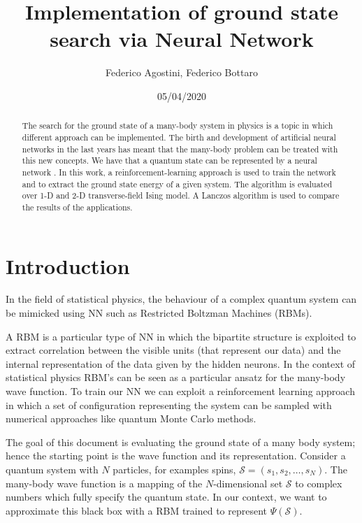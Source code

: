 \documentclass[a4paper,11pt]{article}
\begin{document}
\title{Implementation of ground state search via Neural Network}
\author{Federico Agostini, Federico Bottaro}
\date{05/04/2020}
\maketitle


\begin{abstract}

The search for the ground state of a many-body system in physics is a topic in which different approach can be implemented. The birth and development of artificial neural networks in the last years has meant that the many-body problem can be treated with this new concepts. We have that a quantum state can be represented by a neural network \cite{Carleo_2017}. In this work, a reinforcement-learning approach is used to train the network and to extract the ground state energy of a given system. The algorithm is evaluated over 1-D and 2-D transverse-field Ising model. A Lanczos algorithm is used to compare the results of the applications.

\end{abstract}


\section{Introduction}

In the field of statistical physics, the behaviour of a complex quantum system can be mimicked using NN such as Restricted Boltzman Machines (RBMs). 

A RBM is a particular type of NN in which the bipartite structure is exploited to extract correlation between the visible units (that represent our data) and the internal representation of the data given by the hidden neurons. In the context of statistical physics RBM's can be seen as a particular ansatz for the many-body wave function. To train our NN we can exploit a reinforcement learning approach in which a set of configuration representing the system can be sampled with numerical approaches like quantum Monte Carlo methods.

The goal of this document is evaluating the ground state of a many body system; hence the starting point is the wave function and its representation. Consider a quantum system with $N$ particles, for examples spins, $\mathcal{S}=(s_1,s_2,\dots,s_N)$. The many-body wave function is a mapping of the $N$-dimensional set $\mathcal{S}$ to complex numbers which fully specify the quantum state. In our context, we want to approximate this black box with a RBM trained to represent $\Psi(\mathcal{S})$.
\end{document}

